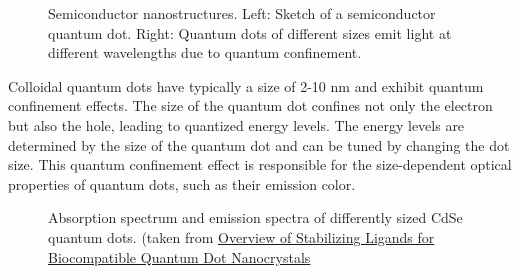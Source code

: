\documentclass[
  a4paper,
]{book}
\begin{document}
\begin{tcolorbox}
\begin{figure}[H]
\begin{minipage}{0.50\linewidth}
{}


\end{minipage}%

\caption{\label{fig-quantum-dots}Semiconductor nanostructures. Left:
Sketch of a semiconductor quantum dot. Right: Quantum dots of different
sizes emit light at different wavelengths due to quantum confinement.}

\end{figure}%

Colloidal quantum dots have typically a size of 2-10 nm and exhibit
quantum confinement effects. The size of the quantum dot confines not
only the electron but also the hole, leading to quantized energy levels.
The energy levels are determined by the size of the quantum dot and can
be tuned by changing the dot size. This quantum confinement effect is
responsible for the size-dependent optical properties of quantum dots,
such as their emission color.

\begin{figure}[H]


\caption{\label{fig-quantum-dots1}Absorption spectrum and emission
spectra of differently sized CdSe quantum dots. (taken from
\href{https://www.mdpi.com/1424-8220/11/12/11036}{Overview of
Stabilizing Ligands for Biocompatible Quantum Dot Nanocrystals}}

\end{figure}%

\end{tcolorbox}
\end{document}
